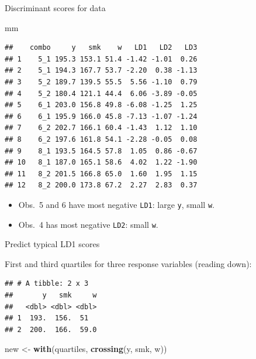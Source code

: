 \documentclass[ignorenonframetext,]{beamer}
\newenvironment{Shaded}{\begin{snugshade}}{\end{snugshade}}
\newcommand{\FloatTok}[1]{\textcolor[rgb]{0.00,0.00,0.81}{#1}}
\newcommand{\KeywordTok}[1]{\textcolor[rgb]{0.13,0.29,0.53}{\textbf{#1}}}
\newcommand{\NormalTok}[1]{#1}
\newcommand{\OperatorTok}[1]{\textcolor[rgb]{0.81,0.36,0.00}{\textbf{#1}}}
\newcommand{\StringTok}[1]{\textcolor[rgb]{0.31,0.60,0.02}{#1}}
\begin{document}
\begin{frame}[fragile]{Discriminant scores for data}
\protect\hypertarget{discriminant-scores-for-data}{}

\begin{Shaded}
\begin{Highlighting}[]
\NormalTok{mm}
\end{Highlighting}
\end{Shaded}

\begin{verbatim}
##    combo     y   smk    w   LD1   LD2   LD3
## 1    5_1 195.3 153.1 51.4 -1.42 -1.01  0.26
## 2    5_1 194.3 167.7 53.7 -2.20  0.38 -1.13
## 3    5_2 189.7 139.5 55.5  5.56 -1.10  0.79
## 4    5_2 180.4 121.1 44.4  6.06 -3.89 -0.05
## 5    6_1 203.0 156.8 49.8 -6.08 -1.25  1.25
## 6    6_1 195.9 166.0 45.8 -7.13 -1.07 -1.24
## 7    6_2 202.7 166.1 60.4 -1.43  1.12  1.10
## 8    6_2 197.6 161.8 54.1 -2.28 -0.05  0.08
## 9    8_1 193.5 164.5 57.8  1.05  0.86 -0.67
## 10   8_1 187.0 165.1 58.6  4.02  1.22 -1.90
## 11   8_2 201.5 166.8 65.0  1.60  1.95  1.15
## 12   8_2 200.0 173.8 67.2  2.27  2.83  0.37
\end{verbatim}

\begin{itemize}
\item
  Obs.~5 and 6 have most negative \texttt{LD1}: large \texttt{y}, small
  \texttt{w}.
\item
  Obs.~4 has most negative \texttt{LD2}: small \texttt{w}.
\end{itemize}

\end{frame}

\begin{frame}[fragile]{Predict typical LD1 scores}
\protect\hypertarget{predict-typical-ld1-scores}{}

First and third quartiles for three response variables (reading down):

\begin{Shaded}
\end{Shaded}

\begin{verbatim}
## # A tibble: 2 x 3
##       y   smk     w
##   <dbl> <dbl> <dbl>
## 1  193.  156.  51  
## 2  200.  166.  59.0
\end{verbatim}

\begin{Shaded}
\begin{Highlighting}[]
\NormalTok{new <-}\StringTok{ }\KeywordTok{with}\NormalTok{(quartiles, }\KeywordTok{crossing}\NormalTok{(y, smk, w))}
\end{Highlighting}
\end{Shaded}

\end{frame}
\end{document}
